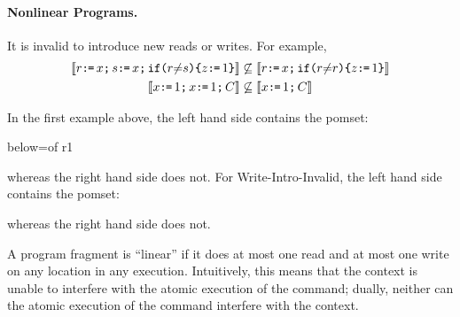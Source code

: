 \paragraph{Nonlinear Programs.}

It is invalid to introduce new reads or writes.  For example, 
\begin{align*}
  \llbracket r \texttt{:}\mkern-1mu\texttt{=}\, x \texttt{;}\,\allowbreak s \texttt{:}\mkern-1mu\texttt{=}\, x  \texttt{;}\,\allowbreak 
    \texttt{if}\allowbreak\texttt{(}r {\neq}s\texttt{)} \allowbreak\texttt{\{} z \texttt{:}\mkern-1mu\texttt{=}\, 1 \texttt{\}}\rrbracket &\not\subseteq
  \llbracket r \texttt{:}\mkern-1mu\texttt{=}\, x \texttt{;}\,\allowbreak \texttt{if}\allowbreak\texttt{(}r {\neq} r\texttt{)} \allowbreak\texttt{\{} z \texttt{:}\mkern-1mu\texttt{=}\, 1 \texttt{\}}\rrbracket
  \\
  \llbracket x \texttt{:}\mkern-1mu\texttt{=}\, 1 \texttt{;}\,\allowbreak x \texttt{:}\mkern-1mu\texttt{=}\, 1 \texttt{;}\,\allowbreak C\rrbracket &\not\subseteq
  \llbracket x \texttt{:}\mkern-1mu\texttt{=}\, 1 \texttt{;}\,\allowbreak C\rrbracket 
\end{align*}

In the first example above, the left hand side contains the pomset:
\begin{tikzdisplay}[node distance=1em]
   {below=of r1}
\end{tikzdisplay}
whereas the right hand side does not.   For Write-Intro-Invalid, the left hand side contains the pomset:
\begin{tikzdisplay}
\end{tikzdisplay}
whereas the right hand side does not.


A program fragment is ``linear'' if it does at most one read and at most one write on any location in any execution.  Intuitively, this means that the context is unable to interfere with the atomic execution of the command; dually, neither can the atomic execution of the command interfere with the context.  


